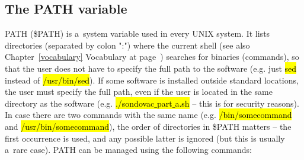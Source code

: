 \documentclass[a4paper, 11pt, twoside]{article}
\renewcommand{\texttt}[1]{\hl{\ttfamily #1}}
\begin{document}
\subsection{The PATH variable}

PATH (\$PATH) is a~system variable used in every UNIX system. It lists directories (separated by colon ":") where the current shell (see also Chapter~\ref{vocabulary} Vocabulary at page~\pageref{vocabulary}) searches for binaries (commands), so that the user does not have to specify the full path to the software (e.g. just \texttt{sed} instead of \texttt{/usr/bin/sed}). If some software is installed outside standard locations, the user must specify the full path, even if the user is located in the same directory as the software (e.g. \texttt{./sondovac$\_$part$\_$a.sh} -- this is for security reasons). In case there are two commands with the same name (e.g. \texttt{/bin/somecommand} and \texttt{/usr/bin/somecommand}), the order of directories in \$PATH matters -- the first occurrence is used, and any possible latter is ignored (but this is usually a~rare case). PATH can be managed using the following commands:

\end{document}
